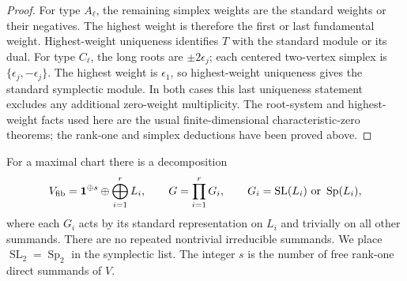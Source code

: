\begin{proof}
For type $A_\ell$, the remaining simplex weights are the standard
weights or their negatives.  The highest weight is therefore
the first or last fundamental weight.  Highest-weight uniqueness
\cite[Theorem 4.3]{Cap2016}
identifies $T$ with the standard module or its dual.  For type
$C_\ell$, the long roots are $\pm2\epsilon_j$; each centered
two-vertex simplex is $\{\epsilon_j,-\epsilon_j\}$.  The
highest weight is $\epsilon_1$, so highest-weight uniqueness
gives the standard symplectic module.  In both cases this last
uniqueness statement excludes any additional zero-weight
multiplicity.  The root-system and highest-weight facts used here
are the usual finite-dimensional characteristic-zero theorems;
the rank-one and simplex deductions have been proved above.
\end{proof}

\begin{theorem}
\label{loc:slsp}
For a maximal chart there is a decomposition
\begin{equation}
 V_{\mathrm{fib}}={\bf1}^{\oplus s}\oplus\bigoplus_{i=1}^r L_i,
 \qquad
 G=\prod_{i=1}^rG_i,
 \qquad
 G_i=\operatorname{SL}(L_i)\ \text{or}\
       \operatorname{Sp}(L_i),
 \label{loc:group-product}
\end{equation}
where each $G_i$ acts by its standard representation on $L_i$
and trivially on all other summands.  There are no repeated
nontrivial irreducible summands.  We place
$\operatorname{SL}_2=\operatorname{Sp}_2$ in the symplectic list.
The integer $s$ is the number of free rank-one direct summands
of $V$.
\end{theorem}

